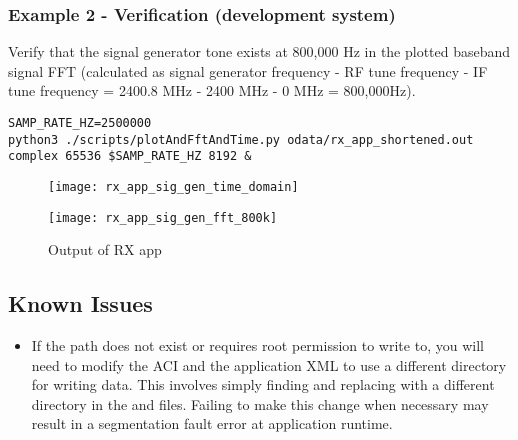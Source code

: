 \subsubsection{Example 2 - Verification (development system)}
Verify that the signal generator tone exists at 800,000 Hz in the plotted baseband signal FFT (calculated as signal generator frequency - RF tune frequency - IF tune frequency = 2400.8 MHz - 2400 MHz - 0 MHz = 800,000Hz).
\begin{lstlisting}
SAMP_RATE_HZ=2500000
python3 ./scripts/plotAndFftAndTime.py odata/rx_app_shortened.out complex 65536 $SAMP_RATE_HZ 8192 &
\end{lstlisting}
        \begin{figure}[H]
        \begin{minipage}{.5\textwidth}
                \texttt{[image: rx\_app\_sig\_gen\_time\_domain]}
                \label{fig:rx_app_sig_gen_time_domain}
        \end{minipage}%
        \begin{minipage}{.5\textwidth}
                \texttt{[image: rx\_app\_sig\_gen\_fft\_800k]}
        \end{minipage}
                \caption{Output of RX app}
                \label{fig:rx_app_sig_gen_fft}
        \end{figure}
\pagebreak
\subsection{Known Issues}
\noindent
\begin{itemize}
  \item If the path  does not exist or requires root permission to write to, you will need to modify the ACI and the application XML to use a different directory for writing data. This involves simply finding and replacing  with a different directory in the  and  files. Failing to make this change when necessary may result in a segmentation fault error at application runtime.
\end{itemize}

